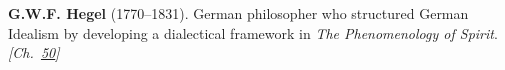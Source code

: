 \textbf{G.W.F. Hegel} (1770–1831). German philosopher who structured German Idealism by developing a dialectical framework in \emph{The Phenomenology of Spirit}. \emph{[Ch.~\hyperref[ch:consciousness]{50}]}

